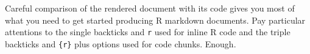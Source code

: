 \documentclass[10pt] {article}
\newcommand{\eps}[3]
{{\begin{center}
 \rotatebox{#1}{\scalebox{#2}{\texttt{[image: \#3]}}}
 \end{center}}
}
\theoremstyle{definition}
\begin{document}
\vspace*{-2cm}

\eps{0}{.7}{md-notes.pdf}

\noindent Careful comparison of the rendered document with its code gives you most of what you need to get started producing R markdown documents. Pay particular attentions to the single backticks and {\tt r} used for inline R code and the triple backticks and \verb+{r}+ plus options used for code chunks. Enough.


\begin{lstlisting}

\end{lstlisting}


\printindex
\end{document}
